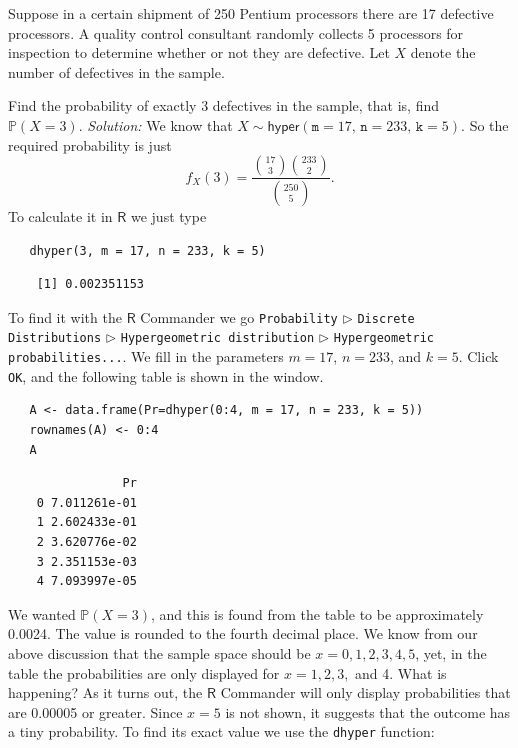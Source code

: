 \documentclass[captions=tableheading]{scrbook}
\begin{document}
\begin{example}
Suppose in a certain shipment of 250 Pentium processors there are 17 defective processors. A quality control consultant randomly collects 5 processors for inspection to determine whether or not they are defective. Let \(X\) denote the number of defectives in the sample.

Find the probability of exactly 3 defectives in the sample, that is, find \(\mathbb{P}(X=3)\). 
   \emph{Solution:} We know that \(X\sim\mathsf{hyper}(\mathtt{m}=17,\,\mathtt{n}=233,\,\mathtt{k}=5)\). So the required probability is just
   \[
   f_{X}(3)=\frac{{17 \choose 3}{233 \choose 2}}{{250 \choose 5}}.
   \]
   To calculate it in \(\mathsf{R}\) we just type 


\lstset{language=R}
\begin{lstlisting}
   dhyper(3, m = 17, n = 233, k = 5)
\end{lstlisting}

\begin{verbatim}
    [1] 0.002351153
\end{verbatim}

   To find it with the \(\mathsf{R}\) Commander we go \texttt{Probability} \(\triangleright\) \texttt{Discrete Distributions} \(\triangleright\) \texttt{Hypergeometric distribution} \(\triangleright\) \texttt{Hypergeometric probabilities...}. We fill in the parameters \(m=17\), \(n=233\), and \(k=5\). Click \texttt{OK}, and the following table is shown in the window.


\lstset{language=R}
\begin{lstlisting}
   A <- data.frame(Pr=dhyper(0:4, m = 17, n = 233, k = 5))
   rownames(A) <- 0:4 
   A
\end{lstlisting}

\begin{verbatim}
                Pr
    0 7.011261e-01
    1 2.602433e-01
    2 3.620776e-02
    3 2.351153e-03
    4 7.093997e-05
\end{verbatim}

   We wanted \(\mathbb{P}(X=3)\), and this is found from the table to be approximately 0.0024. The value is rounded to the fourth decimal place.
   We know from our above discussion that the sample space should be \(x=0,1,2,3,4,5\), yet, in the table the probabilities are only displayed for \(x = 1,2,3,\) and 4. What is happening? As it turns out, the \(\mathsf{R}\) Commander will only display probabilities that are 0.00005 or greater. Since \(x=5\) is not shown, it suggests that the outcome has a tiny probability. To find its exact value we use the \texttt{dhyper} function:


\end{example}
\end{document}
